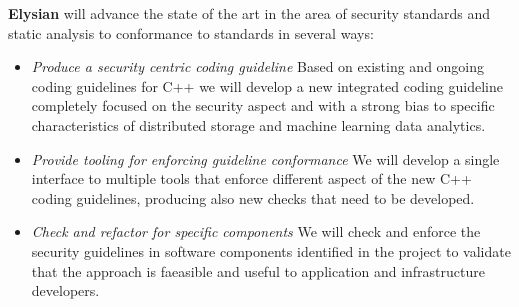 \documentclass[a4paper,11pt]{article}
\newcommand{\project}[1]{\textbf{#1}\xspace}
\newcommand{\SECURITY}{\project{Elysian}}
\newcommand{\TheProject}{\SECURITY}
\begin{document}
\begin{mdframed}[backgroundcolor=gray!10]
\TheProject{} will advance the state of the art in the area of security standards and static analysis to conformance to standards in several ways:
\begin{itemize}
\item \emph{Produce a security centric coding guideline} 
Based on existing and ongoing coding guidelines for C++ we will develop a new
integrated coding guideline completely focused on the security aspect and with
a strong bias to specific characteristics of distributed storage and machine
learning data analytics.

\item \emph{Provide tooling for enforcing guideline conformance} 
We will develop a single interface to multiple tools that enforce different aspect
of the new C++ coding guidelines, producing also new checks that need to be developed.

\item \emph{Check and refactor for specific components} 
We will check and enforce the security guidelines in software components identified
in the project to validate that the approach is faeasible and useful to
application and infrastructure developers. 

\end{itemize}
\end{mdframed}
\end{document}

